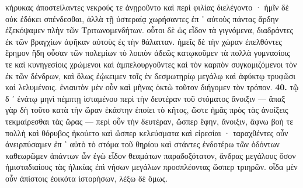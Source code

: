 \documentclass[a4paper, 11pt, oneside, polutonikogreek, german]{article}
\begin{document}
κήρυκας ἀποστείλαντες νεκρούς τε ἀνῃροῦντο καὶ περὶ φιλίας διελέγοντο · ἡμῖν δὲ οὐκ ἐδόκει σπένδεσθαι, ἀλλὰ τῇ ὑστεραίᾳ χωρήσαντες ἐπ ᾽ αὐτοὺς πάντας ἄρδην ἐξεκόψαμεν πλὴν τῶν Τριτωνομενδήτων. οὗτοι δὲ ὡς εἶδον τὰ γιγνόμενα, διαδράντες ἐκ τῶν βραγχίων ἀφῆκαν αὑτοὺς ἐς τὴν θάλατταν. ἡμεῖς δὲ τὴν χώραν ἐπελθόντες ἔρημον ἤδη οὖσαν τῶν πολεμίων τὸ λοιπὸν ἀδεῶς κατῳκοῦμεν τὰ πολλὰ γυμνασίοις τε καὶ κυνηγεσίοις χρώμενοι καὶ ἀμπελουργοῦντες καὶ τὸν καρπὸν συγκομιζόμενοι τὸν ἐκ τῶν δένδρων, καὶ ὅλως ἐῴκειμεν τοῖς ἐν δεσμωτηρίῳ μεγάλῳ καὶ ἀφύκτῳ τρυφῶσι καὶ λελυμένοις. ἐνιαυτὸν μὲν οὖν καὶ μῆνας ὀκτὼ τοῦτον διήγομεν τὸν τρόπον. \textbf{40.} τῷ δ ᾽ ἐνάτῳ μηνὶ πέμπτῃ ἱσταμένου περὶ τὴν δευτέραν τοῦ στόματος ἄνοιξιν --- ἄπαξ γὰρ δὴ τοῦτο κατὰ τὴν ὥραν ἑκάστην ἐποίει τὸ κῆτος, ὥστε ἡμᾶς πρὸς τὰς ἀνοίξεις τεκμαίρεσθαι τὰς ὥρας --- περὶ οὖν τὴν δευτέραν, ὥσπερ ἔφην, ἄνοιξιν, ἄφνω βοή τε πολλὴ καὶ θόρυβος ἠκούετο καὶ ὥσπερ κελεύσματα καὶ εἰρεσίαι · ταραχθέντες οὖν ἀνειρπύσαμεν ἐπ ᾽ αὐτὸ τὸ στόμα τοῦ θηρίου καὶ στάντες ἐνδοτέρω τῶν ὀδόντων καθεωρῶμεν ἁπάντων ὧν ἐγὼ εἶδον θεαμάτων παραδοξότατον, ἄνδρας μεγάλους ὅσον ἡμισταδιαίους τὰς ἡλικίας ἐπὶ νήσων μεγάλων προσπλέοντας ὥσπερ τριηρῶν. οἶδα μὲν οὖν ἀπίστοις ἐοικότα ἱστορήσων, λέξω δὲ ὅμως.
\end{document}
